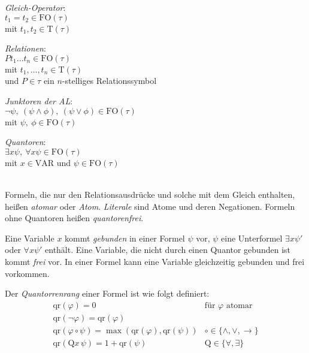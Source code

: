 \documentclass[a4paper,parskip=half*,DIV=15,fontsize=11pt]{scrartcl}
\newcommand{\FO}{\mathrm{FO}}
\newcommand{\VAR}{\mathrm{VAR}}
\newcommand{\T}{\mathrm{T}}
\newcommand{\qr}{\mathrm{qr}}
\begin{document}
\begin{minipage}[t]{0.2\textwidth}
\begin{center}
\emph{Gleich-Operator}: \\
$t_1 = t_2 \in \FO(\tau)$ \\ \footnotesize
mit $t_1, t_2 \in \T(\tau)$
\end{center}
\end{minipage}
\begin{minipage}[t]{0.25\textwidth}
\begin{center}
\emph{Relationen}: \\
$P t_1 \ldots t_n \in \FO(\tau)$ \\ \footnotesize
mit $t_1, \ldots, t_n \in \T(\tau)$ \\
und $P \in \tau$ ein $n$-stelliges Relationssymbol
\end{center}
\end{minipage}
\begin{minipage}[t]{0.3\textwidth}
\begin{center}
\emph{Junktoren der AL}: \\
$\neg \psi,\ (\psi \land \phi),\ (\psi \lor \phi) \in \FO(\tau)$ \\ \footnotesize
mit $\psi,\ \phi \in \FO(\tau)$
\end{center}
\end{minipage}
\begin{minipage}[t]{0.25\textwidth}
\begin{center}
\emph{Quantoren}: \\
$\exists x \psi,\ \forall x \psi \in \FO(\tau)$ \\ \footnotesize
mit $x \in \VAR$ und $\psi \in \FO(\tau)$
\end{center}
\end{minipage}
\ \\

Formeln, die nur den Relationsausdrücke und solche mit dem Gleich enthalten, heißen \emph{atomar} oder \emph{Atom}. \emph{Literale} sind Atome und deren Negationen. Formeln ohne Quantoren heißen \emph{quantorenfrei}.

Eine Variable $x$ kommt \emph{gebunden} in einer Formel $\psi$ vor, $\psi$ eine Unterformel $\exists x \psi'$ oder $\forall x \psi'$ enthält. Eine Variable, die nicht durch einen Quantor gebunden ist kommt \emph{frei} vor. In einer Formel kann eine Variable gleichzeitig gebunden und frei vorkommen.

Der \emph{Quantorrenrang} einer Formel ist wie folgt definiert:
\[\begin{array}{cc}
\qr(\varphi) = 0 & \text{für $\varphi$ atomar}  \\
\qr(\neg \varphi) = \qr(\varphi)    \\
\qr(\varphi \circ \psi) = \max(\qr(\varphi), \qr(\psi)) &   \circ \in \{\land, \lor, \to\}  \\
\qr(\mathrm{Q}x\,\psi) = 1 + \qr(\psi) & \mathrm{Q} \in \{\forall, \exists\}
\end{array}\]
\end{document}
